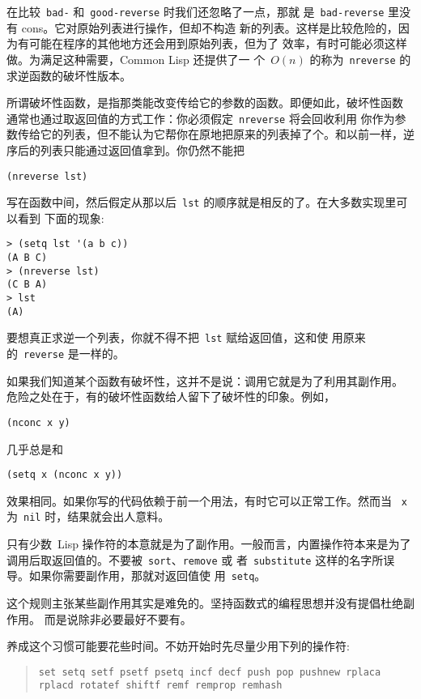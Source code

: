 在比较~\texttt{bad-} 和~\texttt{good-reverse} 时我们还忽略了一点，那就
是~\texttt{bad-reverse} 里没有 cons。它对原始列表进行操作，但却不构造
新的列表。这样是比较危险的，因为有可能在程序的其他地方还会用到原始列表，但为了
效率，有时可能必须这样做。为满足这种需要，Common Lisp 还提供了一
个~$O(n)$ 的称为~\texttt{nreverse} 的求逆函数的破坏性版本。

所谓破坏性函数，是指那类能改变传给它的参数的函数。即便如此，破坏性函数
通常也通过取返回值的方式工作：你必须假定~\texttt{nreverse} 将会回收利用
你作为参数传给它的列表，但不能认为它帮你在原地把原来的列表掉了个。和以前一样，逆
序后的列表只能通过返回值拿到。你仍然不能把
\begin{lstlisting}
(nreverse lst)
\end{lstlisting}
写在函数中间，然后假定从那以后~\texttt{lst} 的顺序就是相反的了。在大多数实现里可以看到
下面的现象:
\begin{lstlisting}
> (setq lst '(a b c))
(A B C)
> (nreverse lst)
(C B A)
> lst
(A)
\end{lstlisting}
要想真正求逆一个列表，你就不得不把~\texttt{lst} 赋给返回值，这和使
用原来的~\texttt{reverse} 是一样的。

如果我们知道某个函数有破坏性，这并不是说：调用它就是为了利用其副作用。
危险之处在于，有的破坏性函数给人留下了破坏性的印象。例如，
\begin{lstlisting}
(nconc x y)
\end{lstlisting}
几乎总是和
\begin{lstlisting}
(setq x (nconc x y))
\end{lstlisting}
效果相同。如果你写的代码依赖于前一个用法，有时它可以正常工作。然而当
~\verb|x| 为~\verb|nil| 时，结果就会出人意料。

只有少数~Lisp 操作符的本意就是为了副作用。一般而言，内置操作符本来是为了
调用后取返回值的。不要被~\verb|sort|、\verb|remove| 或
者~\verb|substitute| 这样的名字所误导。如果你需要副作用，那就对返回值使
用~\verb|setq|。

这个规则主张某些副作用其实是难免的。坚持函数式的编程思想并没有提倡杜绝副作用。
而是说除非必要最好不要有。

养成这个习惯可能要花些时间。不妨开始时先尽量少用下列的操作符:

\begin{quote}
\texttt{set setq setf psetf psetq incf decf push pop pushnew
rplaca rplacd rotatef shiftf remf remprop remhash}
\end{quote}


